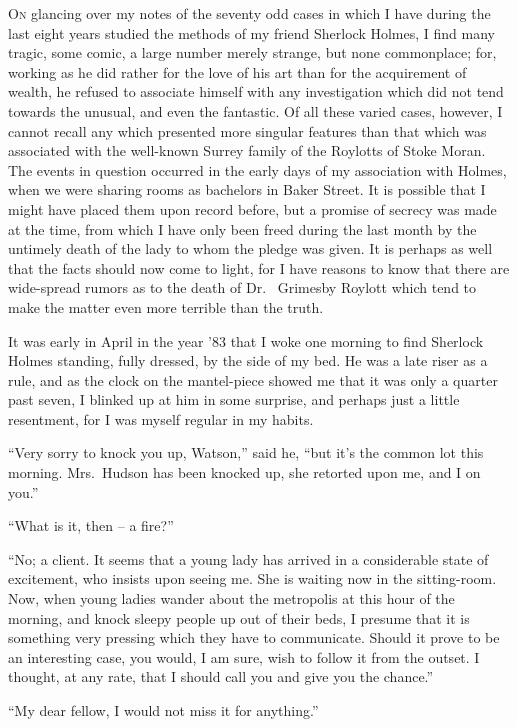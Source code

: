 \textsc{On} glancing over my notes of the seventy odd cases
in which I have during the last eight years studied
the methods of my friend Sherlock Holmes, I find
many tragic, some comic, a large number merely
strange, but none commonplace; for, working as he did rather
for the love of his art than for the acquirement of wealth,
he refused to associate himself with any investigation which
did not tend towards the unusual, and even the fantastic.
Of all these varied cases, however, I cannot recall any which
presented more singular features than that which was associated
with the well-known Surrey family of the Roylotts of
Stoke Moran. The events in question occurred in the early
days of my association with Holmes, when we were sharing
rooms as bachelors in Baker Street. It is possible that I
might have placed them upon record before, but a promise of
secrecy was made at the time, from which I have only been
freed during the last month by the untimely death of the lady
to whom the pledge was given. It is perhaps as well that the
facts should now come to light, for I have reasons to know
that there are wide-spread rumors as to the death of Dr.\ %
Grimesby Roylott which tend to make the matter even more
terrible than the truth.

It was early in April in the year ’83 that I woke one morning
to find Sherlock Holmes standing, fully dressed, by the
side of my bed. He was a late riser as a rule, and as the
clock on the mantel-piece showed me that it was only a quarter
past seven, I blinked up at him in some surprise, and
perhaps just a little resentment, for I was myself regular in my
habits.

“Very sorry to knock you up, Watson,” said he, “but it’s
the common lot this morning. Mrs.~Hudson has been knocked
up, she retorted upon me, and I on you.”

“What is it, then -- a fire?”

“No; a client. It seems that a young lady has arrived in
a considerable state of excitement, who insists upon seeing
me. She is waiting now in the sitting-room. Now, when
young ladies wander about the metropolis at this hour of the
morning, and knock sleepy people up out of their beds, I presume
that it is something very pressing which they have to
communicate. Should it prove to be an interesting case, you
would, I am sure, wish to follow it from the outset. I thought,
at any rate, that I should call you and give you the chance.”

“My dear fellow, I would not miss it for anything.”

